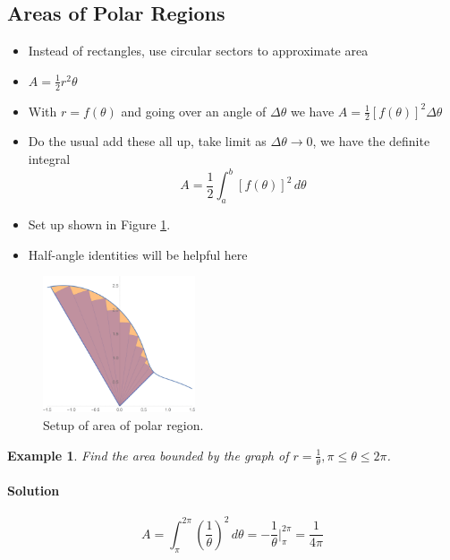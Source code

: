 \documentclass[letterpaper, 11pt, openany]{book}
\theoremstyle{mytheoremstyle}
\theoremstyle{myexamplestyle}
\newtheorem{example}{Example}[section]
\newenvironment{solution}{\paragraph{\sffamily \smaller \fontseries{b}\selectfont Solution}}{\hfill\faSquare}
\begin{document}
\subsection{Areas of Polar Regions}
\begin{itemize}
    \item Instead of rectangles, use circular sectors to approximate area
    \item $A = \frac{1}{2}r^{2} \theta$
    \item With $r = f(\theta)$ and going over an angle of $\Delta \theta$ we have $A = \frac{1}{2} [f(\theta)]^{2} \Delta \theta$
    \item Do the usual add these all up, take limit as $\Delta \theta \to 0$, we have the definite integral \faSmile
    \[A = \frac{1}{2} \int_{a}^{b} [f(\theta)]^{2} \, d\theta\]
    \item Set up shown in Figure \ref{f:polarrects}.
    \item Half-angle identities will be helpful here
\end{itemize}

\begin{figure}[htbp]
    \centering
        \includegraphics[width=0.4\textwidth]{Figures/polarrects.png}
    \caption{Setup of area of polar region.}
    \label{f:polarrects}
\end{figure}

\begin{example}\label{e:polararearecip}
    Find the area bounded by the graph of $r = \frac{1}{\theta}, \pi \leq \theta \leq 2\pi$.
    \begin{solution}
        \[A = \int_{\pi}^{2\pi} \left( \frac{1}{\theta} \right)^{2} \, d\theta = -\frac{1}{\theta}\bigg|_{\pi}^{2\pi} = \frac{1}{4\pi}\]
    \end{solution}
\end{example}
\end{document}
